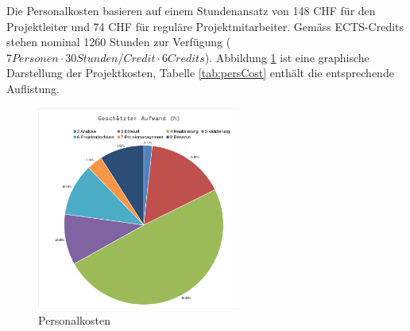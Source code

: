 

Die  Personalkosten  basieren  auf  einem  Stundenansatz  von  148  CHF  f\"ur
den  Projektleiter und  74 CHF  f\"ur regul\"are  Projektmitarbeiter. Gem\"ass
ECTS-Credits stehen  nominal 1260 Stunden  zur Verf\"ugung ($7  Personen \cdot
30  Stunden/Credit \cdot  6 Credits$). Abbildung  \ref{fig:persCost} ist  eine
graphische Darstellung der Projektkosten, Tabelle \ref{tab:persCost} enth\"alt
die entsprechende Auflistung.

\begin{figure}[h!]
    \centering
    \includegraphics[width=0.6\textwidth,clip=true,trim=1mm 0mm 0mm 1mm]{images/budget.png}
    \caption{Personalkosten}
    \label{fig:persCost}
\end{figure}

